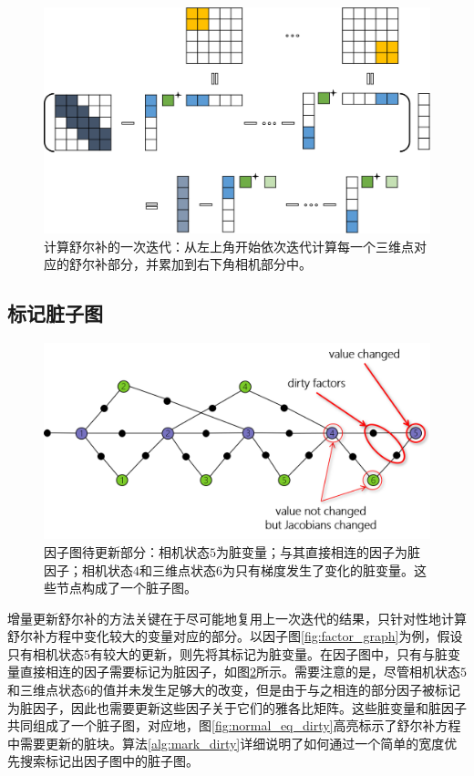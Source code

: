 \begin{figure}[htb!]
    \centering
    \includegraphics[width=\textwidth]{figs/schur_complement.png}
    \caption{计算舒尔补的一次迭代：从左上角开始依次迭代计算每一个三维点对应的舒尔补部分，并累加到右下角相机部分中。}
    \label{fig:schur_complement}
\end{figure}

\subsection{标记脏子图}

\begin{figure}[htb!]
    \centering
    \includegraphics[scale=.7]{figs/factor_graph_dirty.png}
    \caption{因子图待更新部分：相机状态$5$为脏变量；与其直接相连的因子为脏因子；相机状态$4$和三维点状态$6$为只有梯度发生了变化的脏变量。这些节点构成了一个脏子图。}
    \label{fig:factor_graph_dirty}
\end{figure}

增量更新舒尔补的方法关键在于尽可能地复用上一次迭代的结果，只针对性地计算舒尔补方程中变化较大的变量对应的部分。以因子图\ref{fig:factor_graph}为例，假设只有相机状态$5$有较大的更新，则先将其标记为脏变量。在因子图中，只有与脏变量直接相连的因子需要标记为脏因子，如图\ref{fig:factor_graph_dirty}所示。需要注意的是，尽管相机状态$5$和三维点状态$6$的值并未发生足够大的改变，但是由于与之相连的部分因子被标记为脏因子，因此也需要更新这些因子关于它们的雅各比矩阵。这些脏变量和脏因子共同组成了一个脏子图，对应地，图\ref{fig:normal_eq_dirty}高亮标示了舒尔补方程中需要更新的脏块。算法\ref{alg:mark_dirty}详细说明了如何通过一个简单的宽度优先搜索标记出因子图中的脏子图。

